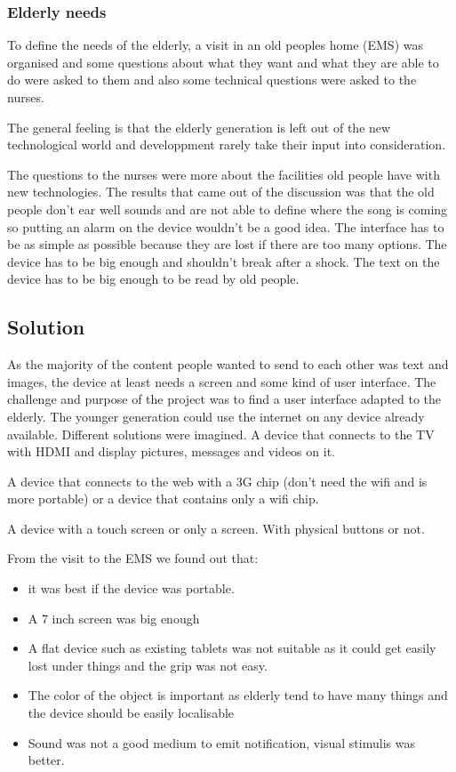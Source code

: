 \subsubsection{Elderly needs}
To define the needs of the elderly, a visit in an old peoples home (EMS) was organised and some questions about what they want and what they are able to do were asked to them and also some technical questions were asked to the nurses.

The general feeling is that the elderly generation is left out of the new technological world and developpment rarely take their input into consideration.

The questions to the nurses were more about the facilities old people have with new technologies. The results that came out of the discussion was that the old people don’t ear well sounds and are not able to define where the song is coming so putting an alarm on the device wouldn’t be a good idea. The interface has to be as simple as possible because they are lost if there are too many options. The device has to be big enough and shouldn’t break after a shock. The text on the device has to be big enough to be read by old people.

\subsection{Solution}
\label{chap: solution}
As the majority of the content people wanted to send to each other was text and images, the device at least needs a screen and some kind of user interface.
The challenge and purpose of the project was to find a user interface adapted to the elderly. The younger generation could use the internet on any device already available.
Different solutions were imagined. A device that connects to the TV with HDMI and display pictures, messages and videos on it.

A device that connects to the web with a 3G chip (don’t need the wifi and is more portable) or a device that contains only a wifi chip.

A device with a touch screen or only a screen. With physical buttons or not.

From the visit to the EMS we found out that:
\begin{itemize}
  \item{it was best if the device was portable. }
  \item{ A 7 inch screen was big enough }
  \item{ A flat device such as existing tablets was not suitable as it could get easily lost under things and the grip was not easy.}
  \item{ The color of the object is important as elderly tend to have many things and the device should be easily localisable}
  \item{ Sound was not a good medium to emit notification, visual stimulis was better.}
\end{itemize}


